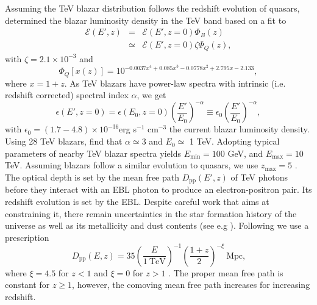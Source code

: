 \documentclass[twocolumns]{emulateapj}
\begin{document}
Assuming the TeV blazar distribution follows the redshift evolution of quasars, \citet{2012ApJ...752...22B} determined the blazar luminosity density in the TeV band based on a fit to \citet{2007ApJ...654..731H}
\begin{eqnarray}
\label{eq:mean_heat}
\mathcal{E}(E',z)&=&\mathcal{E}(E',z=0)\Phi_{B}(z)\\ \nonumber
&\simeq& \mathcal{E}(E',z=0)\zeta\Phi_{Q}(z),
\end{eqnarray}
with $\zeta=2.1\times 10^{-3}$ and
\begin{equation}
\label{eq:phi_quasar}
\Phi_{Q}[x(z)]=10^{-0.0037x^4+0.085x^3-0.0778x^2+2.795x-2.133},
\end{equation}
where $x=1+z$.
As TeV blazars have power-law spectra with intrinsic (i.e. redshift corrected) spectral index $\alpha$, we get
\begin{equation}
\label{eq:blaz_lum}
\epsilon(E',z=0)=\epsilon(E_0,z=0)\left(\frac{E'}{E_0}\right)^{-\alpha}\equiv \epsilon_0\left(\frac{E'}{E_0}\right)^{-\alpha},
\end{equation}
with $\epsilon_0=(1.7-4.8)\times 10^{-36}$erg s$^{-1}$ cm$^{-3}$ the current blazar luminosity density. Using 28 TeV blazars, \citet{2012ApJ...752...23C} find that $\alpha\simeq 3$ and $E_0\simeq $ 1 TeV. Adopting typical parameters of nearby TeV blazar spectra yields $E_{\mathrm{min}}=100$ GeV, and $E_{\mathrm{max}}=10$ TeV. Assuming blazars follow a similar evolution to quasars, we use $z_\mathrm{max}=5$ \citep{2007ApJ...654..731H}.
The optical depth is set by the mean free path $D_\mathrm{pp}(E',z)$ of TeV photons before they interact with an EBL photon to produce an electron-positron pair. Its redshift evolution is set by the EBL. Despite careful work that aims at constraining it, there remain uncertainties in the star formation history of the universe as well as its metallicity and dust contents (see e.g \citet{2008A&A...487..837F,2006ApJ...648..774S}). Following \citet{2012ApJ...752...23C} we use a prescription
\begin{equation}
\label{eq:mean_free_path}
D_{\mathrm{pp}}(E,z)=35\left(\frac{E}{1~\textrm{TeV}}\right)^{-1} \left(\frac{1+z}{2}\right)^{-\xi}~\textrm{Mpc,}
\end{equation}
where $\xi=4.5$ for $z<1$ and $\xi=0$ for $z>1$ \citep{2004A&A...413..807K,2009PhRvD..80l3012N}. The proper mean free path is constant for $z\geq 1$, however, the comoving mean free path increases for increasing redshift.
\end{document}
